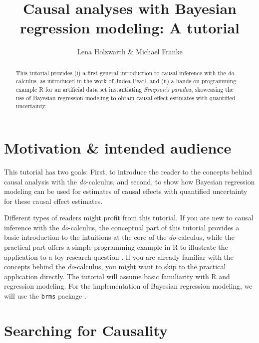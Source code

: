 \documentclass[nobib]{tufte-handout}
\title{Causal analyses with Bayesian regression modeling: A tutorial}
\author{Lena Holzwarth \& Michael Franke}
\date{}
\newcommand{\docalc}{\emph{do}-calculus\xspace}
\begin{document}
\maketitle

\begin{abstract}
\noindent 
This tutorial provides (i) a first general introduction to causal inference with the \docalc, as introduced in the work of Judea Pearl, and (ii) a hands-on programming example R for an artificial data set instantiating \emph{Simpson's paradox}, showcasing the use of Bayesian regression modeling to obtain causal effect estimates with quantified uncertainty.
\end{abstract}

\section{Motivation \& intended audience}

This tutorial has two goals: First, to introduce the reader to the concepts behind causal analysis with the \docalc \citep{pearl2000models}, and second, to show how Bayesian regression modeling can be used for estimates of causal effects with quantified uncertainty for these causal effect estimates.

Different types of readers might profit from this tutorial.
If you are new to causal inference with the \docalc, the conceptual part of this tutorial provides a basic introduction to the intuitions at the core of the \docalc, while the practical part offers a simple programming example in R to illustrate the application to a toy research question \citep{R}. 
If you are already familiar with the concepts behind the \docalc, you might want to skip to the practical application directly. 
The tutorial will assume basic familiarity with R and regression modeling. 
For the implementation of Bayesian regression modeling, we will use the \texttt{brms} package \citep{brms}.

\section{Searching for Causality}
\end{document}
